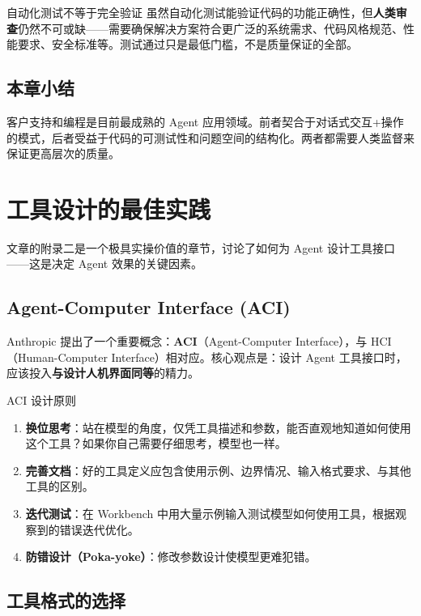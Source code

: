 \documentclass[a4paper]{article}
\begin{document}
\begin{warningbox}{自动化测试不等于完全验证}
虽然自动化测试能验证代码的功能正确性，但\textbf{人类审查}仍然不可或缺——需要确保解决方案符合更广泛的系统需求、代码风格规范、性能要求、安全标准等。测试通过只是最低门槛，不是质量保证的全部。
\end{warningbox}

\subsection{本章小结}
客户支持和编程是目前最成熟的 Agent 应用领域。前者契合于对话式交互+操作的模式，后者受益于代码的可测试性和问题空间的结构化。两者都需要人类监督来保证更高层次的质量。


\section{工具设计的最佳实践}

文章的附录二是一个极具实操价值的章节，讨论了如何为 Agent 设计工具接口——这是决定 Agent 效果的关键因素。

\subsection{Agent-Computer Interface (ACI)}

Anthropic 提出了一个重要概念：\textbf{ACI}（Agent-Computer Interface），与 HCI（Human-Computer Interface）相对应。核心观点是：设计 Agent 工具接口时，应该投入\textbf{与设计人机界面同等}的精力。

\begin{importantbox}{ACI 设计原则}
\begin{enumerate}
    \item \textbf{换位思考}：站在模型的角度，仅凭工具描述和参数，能否直观地知道如何使用这个工具？如果你自己需要仔细思考，模型也一样。
    \item \textbf{完善文档}：好的工具定义应包含使用示例、边界情况、输入格式要求、与其他工具的区别。
    \item \textbf{迭代测试}：在 Workbench 中用大量示例输入测试模型如何使用工具，根据观察到的错误迭代优化。
    \item \textbf{防错设计（Poka-yoke）}：修改参数设计使模型更难犯错。
\end{enumerate}
\end{importantbox}

\subsection{工具格式的选择}
\end{document}
